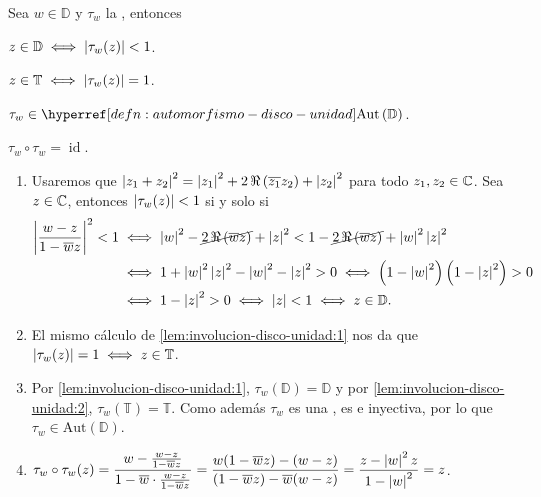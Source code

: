 \begin{lem}\label{lem:involucion-disco-unidad}
    Sea $w \in \mathbb{D}$ y $\tau_w$ la , entonces
    \begin{enu}[2][label=\textnormal{(\arabic*)}, ref=\textnormal{(\arabic*)}]
        \item\label{lem:involucion-disco-unidad:1} $z \in \mathbb{D} \iff \left|\tau_w (z)\right| < 1$.
        \item\label{lem:involucion-disco-unidad:2} $z \in \mathbb{T} \iff \left|\tau_w (z)\right| = 1$.
        \item\label{lem:involucion-disco-unidad:3} $\tau_w \in \exhyperref[defn:automorfismo-disco-unidad]{automorfismo-disco-unidad}{\mathrm{Aut} \left(\mathbb{D} \right)}$.
        \item\label{lem:involucion-disco-unidad:4} $\tau_w \circ \tau_w = \operatorname{id}$.
    \end{enu}
\end{lem}
\begin{dem}
    \begin{enumerate}[label=\textnormal{(\arabic*)}, wide, labelindent=0pt]
        \item Usaremos que $\left|z_1 + z_2\right|^2 = \left|z_1\right|^2 + 2\, \Re\left(\overline{z_1} z_2\right) + \left|z_2\right|^2$ para todo $z_1, z_2 \in \mathbb{C}$. Sea $z \in \mathbb{C}$, entonces $\left|\tau_w(z)\right| < 1$ si y solo si
        \[
        \begin{aligned}
            {\left|\frac{w-z}{1- \overline{w} z}\right|}^2 < 1 &\iff \left|w\right|^2 - \cancel{2\, \Re\left(\overline{w} z\right)} + \left|z\right|^2 < 1 - \cancel{2\, \Re\left(\overline{w} z\right)} + \left|w\right|^2 \left|z\right|^2 \\
            &\iff 1 + \left|w\right|^2 \left|z\right|^2 - \left|w\right|^2 - \left|z\right|^2 > 0 \iff \left(1 - \left|w\right|^2\right) \left(1- \left|z\right|^2\right) > 0 \\
            &\iff 1 - \left|z\right|^2 > 0 \iff \left|z\right| < 1 \iff z \in \mathbb{D}. 
        \end{aligned}
        \]

        \item El mismo cálculo de \ref{lem:involucion-disco-unidad:1} nos da que $\left|\tau_w(z)\right| = 1 \iff z \in \mathbb{T}$.

        \item Por \ref{lem:involucion-disco-unidad:1}, $\tau_w(\mathbb{D}) = \mathbb{D}$ y por \ref{lem:involucion-disco-unidad:2}, $\tau_w(\mathbb{T}) = \mathbb{T}$. Como además $\tau_w$ es una , es  e inyectiva, por lo que $\tau_w \in \mathrm{Aut} \left(\mathbb{D}\right)$.

        \item $\displaystyle \tau_w \circ \tau_w (z) = \frac{w - \frac{w - z}{1 - \overline{w} z}}{1 - \overline{w} \cdot \frac{w - z}{1 - \overline{w} z}} = \frac{w(1 - \overline{w} z) - (w - z)}{(1 - \overline{w} z) - \overline{w}(w - z)} = \frac{z - \left|w\right|^2 z}{1 - \left|w\right|^2} = z$.\hfill\qedsymbol
    \end{enumerate}
\end{dem}

